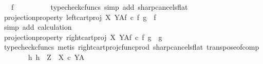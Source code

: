 \begin{isabellebody}
\ {\isachardoublequoteopen}{\isachardot}{\kern0pt}{\isachardot}{\kern0pt}{\isachardot}{\kern0pt}\ {\isacharequal}{\kern0pt}\ f{\isachardoublequoteclose}\isanewline
\ \ \ \ \ \ \ \ \isamarkupfalse%
\ {\isacharparenleft}{\kern0pt}typecheck{\isacharunderscore}{\kern0pt}cfuncs{\isacharcomma}{\kern0pt}\ simp\ add{\isacharcolon}{\kern0pt}\ sharp{\isacharunderscore}{\kern0pt}cancels{\isacharunderscore}{\kern0pt}flat{\isacharparenright}{\kern0pt}\isanewline
\ \ \ \ \ \ \isamarkupfalse%
\ \isamarkupfalse%
\ projection{\isacharunderscore}{\kern0pt}property{}{\isacharcolon}{\kern0pt}\ {\isachardoublequoteopen}{\isacharparenleft}{\kern0pt}{\isacharparenleft}{\kern0pt}left{\isacharunderscore}{\kern0pt}cart{\isacharunderscore}{\kern0pt}proj\ X\ Y{\isacharparenright}{\kern0pt}\isactrlbsup A\isactrlesup \isactrlsub f{\isacharparenright}{\kern0pt}\ {\isasymcirc}\isactrlsub c\ {\isasymlangle}f\isactrlsup {\isasymflat}\ {\isacharcomma}{\kern0pt}g\isactrlsup {\isasymflat}{\isasymrangle}\isactrlsup {\isasymsharp}\ {\isacharequal}{\kern0pt}\ f{\isachardoublequoteclose}\isanewline
\ \ \ \ \ \ \ \ \isamarkupfalse%
\ {\isacharparenleft}{\kern0pt}simp\ add{\isacharcolon}{\kern0pt}\ calculation{\isacharparenright}{\kern0pt}\isanewline
\ \ \ \ \ \ \isamarkupfalse%
\ projection{\isacharunderscore}{\kern0pt}property{}{\isacharcolon}{\kern0pt}\ {\isachardoublequoteopen}{\isacharparenleft}{\kern0pt}{\isacharparenleft}{\kern0pt}right{\isacharunderscore}{\kern0pt}cart{\isacharunderscore}{\kern0pt}proj\ X\ Y{\isacharparenright}{\kern0pt}\isactrlbsup A\isactrlesup \isactrlsub f{\isacharparenright}{\kern0pt}\ {\isasymcirc}\isactrlsub c\ {\isasymlangle}f\isactrlsup {\isasymflat}\ {\isacharcomma}{\kern0pt}g\isactrlsup {\isasymflat}{\isasymrangle}\isactrlsup {\isasymsharp}\ {\isacharequal}{\kern0pt}\ g{\isachardoublequoteclose}\isanewline
\ \ \ \ \ \ \ \ \isamarkupfalse%
\ {\isacharparenleft}{\kern0pt}typecheck{\isacharunderscore}{\kern0pt}cfuncs{\isacharcomma}{\kern0pt}\ metis\ right{\isacharunderscore}{\kern0pt}cart{\isacharunderscore}{\kern0pt}proj{\isacharunderscore}{\kern0pt}cfunc{\isacharunderscore}{\kern0pt}prod\ sharp{\isacharunderscore}{\kern0pt}cancels{\isacharunderscore}{\kern0pt}flat\ transpose{\isacharunderscore}{\kern0pt}of{\isacharunderscore}{\kern0pt}comp{\isacharparenright}{\kern0pt}\isanewline
\ \ \ \ \ \ \isamarkupfalse%
\ {\isachardoublequoteopen}{\isasymAnd}h{}{\isachardot}{\kern0pt}\ h{}\ {\isacharcolon}{\kern0pt}\ Z\ {\isasymrightarrow}\ {\isacharparenleft}{\kern0pt}X\ {\isasymtimes}\isactrlsub c\ Y{\isacharparenright}{\kern0pt}\isactrlbsup A\isactrlesup \ {\isasymLongrightarrow}\isanewline

\end{isabellebody}
